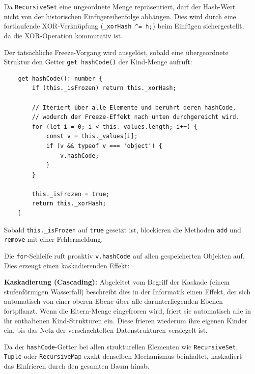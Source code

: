 Da \texttt{RecursiveSet} eine ungeordnete Menge repräsentiert, darf der Hash-Wert nicht von der historischen Einfügereihenfolge abhängen. Dies wird durch eine fortlaufende XOR-Verknüpfung (\texttt{_xorHash ^= h;}) beim Einfügen sichergestellt, da die XOR-Operation kommutativ ist.

Der tatsächliche Freeze-Vorgang wird ausgelöst, sobald eine übergeordnete Struktur den Getter \texttt{get hashCode()} der Kind-Menge aufruft:

\begin{listing}[ht]
    \caption{Einfrieren durch Hash-Abruf}
    \label{lst:rs-freeze-implementation}
    \begin{verbatim}
    get hashCode(): number {
        if (this._isFrozen) return this._xorHash;

        // Iteriert über alle Elemente und berührt deren hashCode, 
        // wodurch der Freeze-Effekt nach unten durchgereicht wird.
        for (let i = 0; i < this._values.length; i++) {
            const v = this._values[i];
            if (v && typeof v === 'object') {
                v.hashCode; 
            }
        }

        this._isFrozen = true;
        return this._xorHash;
    }
    \end{verbatim}
\end{listing}

Sobald \texttt{this._isFrozen} auf \texttt{true} gesetzt ist, blockieren die Methoden \texttt{add} und \texttt{remove} mit einer Fehlermeldung. 

Die \texttt{for}-Schleife ruft proaktiv \texttt{v.hashCode} auf allen gespeicherten Objekten auf. Dies erzeugt einen kaskadierenden Effekt:

\begin{definition}
\label{def:kaskadierung}
\textbf{Kaskadierung (Cascading):} Abgeleitet vom Begriff der Kaskade (einem stufenförmigen Wasserfall) beschreibt dies in der Informatik einen Effekt, der sich automatisch von einer oberen Ebene über alle darunterliegenden Ebenen fortpflanzt. Wenn die Eltern-Menge eingefroren wird, friert sie automatisch alle in ihr enthaltenen Kind-Strukturen ein. Diese frieren wiederum ihre eigenen Kinder ein, bis das Netz der verschachtelten Datenstrukturen versiegelt ist.
\end{definition}

Da der \texttt{hashCode}-Getter bei allen strukturellen Elementen wie \texttt{RecursiveSet}, \texttt{Tuple} oder \texttt{RecursiveMap} exakt denselben Mechanismus beinhaltet, kaskadiert das Einfrieren durch den gesamten Baum hinab.